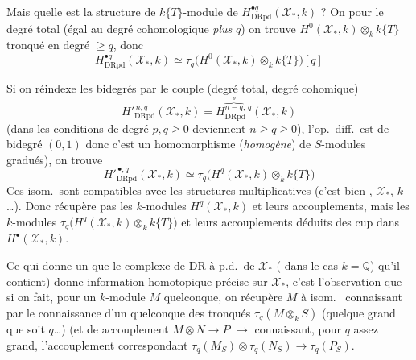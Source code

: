 \documentclass[11pt,a4paper]{article}
\begin{document}
Mais quelle est  la structure de $k\{T\}$-module de $H^{\bullet q}_{\mathrm{DRpd}}(\mathcal{X}_*, k)$ ? On  \struck{\ill{}} pour le degré total (égal au degré cohomologique \emph{plus} $q$) on trouve $H^0(\mathcal{X}_*, k) \otimes_k k\{T\}$ tronqué en degré $\geq q$, donc
\[ H^{\bullet q}_{\mathrm{DRpd}}(\mathcal{X}_*, k) \simeq \tau_q\bigl(H^0(\mathcal{X}_*, k) \otimes_k k\{T\}\bigr)[q] \]

Si on réindexe les bidegrés par le couple (degré total, degré cohomique) 
\[ H'^{\,n,q}_{\mathrm{DRpd}}(\mathcal{X}_*, k) = H^{\overset{p}{\overbrace{n-q}},\,q}_{\mathrm{DRpd}}(\mathcal{X}_*, k) \]
(dans les conditions de degré $p, q \geq 0$ deviennent $n \geq q \geq 0$), l'op.\ diff.\ est de bidegré $(0,1)$ donc c'est un homomorphisme (\emph{homogène}) de $S$-modules gradués), on trouve
\[ H'^{\,\bullet,q}_{\mathrm{DRpd}}(\mathcal{X}_*, k) \simeq \tau_q\bigl(H^q(\mathcal{X}_*, k) \otimes_k k\{T\}\bigr) \]
Ces isom.\ sont compatibles avec les structures multiplicatives (c'est bien ,   $\mathcal{X}_*$, $k$…). Donc   récupère  pas les $k$-modules $H^q(\mathcal{X}_*, k)$ et leurs accouplements, mais les $k$-modules  $\tau_q\bigl(H^q(\mathcal{X}_*, k) \otimes_k k\{T\}\bigr)$ et leurs accouplements déduits des cup dans $H^\bullet(\mathcal{X}_*, k)$.

Ce qui donne un  que le complexe de DR à p.d.\ de $\mathcal{X}_*$  ( dans le cas $k = \mathbb{Q}$) qu'il contient) donne   information homotopique précise sur $\mathcal{X}_*$, c'est l'observation que si on fait, pour un   $k$-module $M$ quelconque, on récupère $M$ à isom.\  connaissant  par le connaissance d'un quelconque des tronqués $\tau_q(M \otimes_k S)$ (quelque  grand que soit $q$…) (et de  accouplement $M \otimes N \to P$ $\to$ connaissant, pour $q$ assez grand, l'accouplement correspondant $\tau_q(M_S) \otimes \tau_q(N_S) \to \tau_q(P_S)$.
\end{document}
